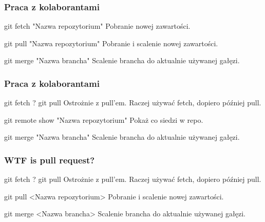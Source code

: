 \documentclass[9pt]{beamer}
\begin{document}
		
	\begin{frame}
		\frametitle{Praca z kolaborantami}

			\begin{block}{git fetch "Nazwa repozytorium"}
				Pobranie nowej zawartości.
			\end{block}

			\begin{block}{git pull "Nazwa repozytorium"}
				Pobranie i scalenie nowej zawartości.
			\end{block}	

			\begin{block}{git merge "Nazwa brancha"}
				Scalenie brancha do aktualnie używanej gałęzi.
			\end{block}	
			
					
						
	\end{frame}
	
		
	\begin{frame}
		\frametitle{Praca z kolaborantami}

			\begin{block}{git fetch ? git pull}
				Ostrożnie z pull'em. Raczej używać fetch, dopiero później pull.
			\end{block}

			\begin{block}{git remote show "Nazwa repozytorium"}
				Pokaż co siedzi w repo.
			\end{block}	

			\begin{block}{git merge "Nazwa brancha"}
				Scalenie brancha do aktualnie używanej gałęzi.
			\end{block}	
			
					
						
	\end{frame}
	
		
	\begin{frame}
		\frametitle{WTF is pull request?}

			\begin{block}{git fetch ? git pull}
				Ostrożnie z pull'em. Raczej używać fetch, dopiero później pull.
			\end{block}

			\begin{block}{git pull <Nazwa repozytorium>}
				Pobranie i scalenie nowej zawartości.
			\end{block}	

			\begin{block}{git merge <Nazwa brancha>}
				Scalenie brancha do aktualnie używanej gałęzi.
			\end{block}	
			
					
						
	\end{frame}
		
\end{document}
